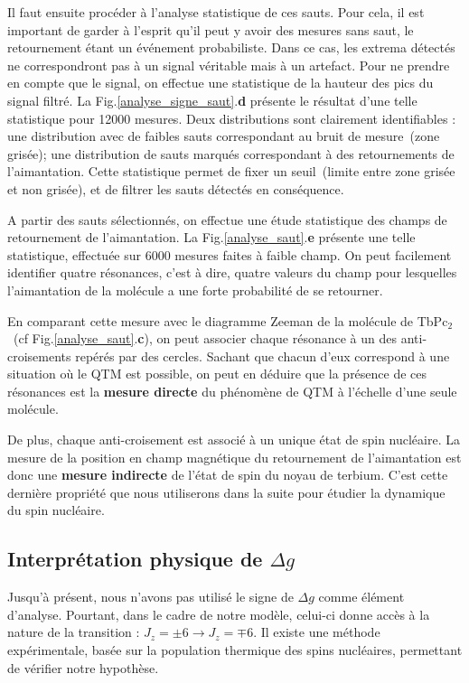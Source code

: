 Il faut ensuite procéder à l'analyse statistique de ces sauts. Pour cela, il est important de garder à l'esprit qu'il peut y avoir des mesures sans saut, le retournement étant un événement probabiliste. Dans ce cas, les extrema détectés ne correspondront pas à un signal véritable mais à un artefact. Pour ne prendre en compte que le signal, on effectue une statistique de la hauteur des pics du signal filtré. La Fig.\ref{analyse_signe_saut}.\textbf{d} présente le résultat d'une telle statistique pour 12000 mesures. Deux distributions sont clairement identifiables : une distribution avec de faibles sauts correspondant au bruit de mesure~(zone grisée); une distribution de sauts marqués correspondant à des retournements de l'aimantation. Cette statistique permet de fixer un seuil~(limite entre zone grisée et non grisée), et de filtrer les sauts détectés en conséquence.

A partir des sauts sélectionnés, on effectue une étude statistique des champs de retournement de l'aimantation. La Fig.\ref{analyse_saut}.\textbf{e} présente une telle statistique, effectuée sur 6000 mesures faites à faible champ. On peut facilement identifier quatre résonances, c'est à dire, quatre valeurs du champ pour lesquelles l'aimantation de la molécule a une forte probabilité de se retourner. 

En comparant cette mesure avec le diagramme Zeeman de la molécule de TbPc$_2$~(cf Fig.\ref{analyse_saut}.\textbf{c}), on peut associer chaque résonance à un des anti-croisements repérés par des cercles. Sachant que chacun d'eux correspond à une situation où le QTM est possible, on peut en déduire que la présence de ces résonances est la \textbf{mesure directe} du phénomène de QTM à l'échelle d'une seule molécule. 

De plus, chaque anti-croisement est associé à un unique état de spin nucléaire. La mesure de la position en champ magnétique du retournement de l'aimantation est donc une \textbf{mesure indirecte} de l'état de spin du noyau de terbium. C'est cette dernière propriété que nous utiliserons dans la suite pour étudier la dynamique du spin nucléaire.

\subsection{Interprétation physique de $\Delta g$}
Jusqu'à présent, nous n'avons pas utilisé le signe de $\Delta g$ comme élément d'analyse. Pourtant, dans le cadre de notre modèle, celui-ci donne accès à la nature de la transition : $J_z = \pm6 \rightarrow J_z = \mp 6$. Il existe une méthode expérimentale, basée sur la population thermique des spins nucléaires, permettant de vérifier notre hypothèse.

